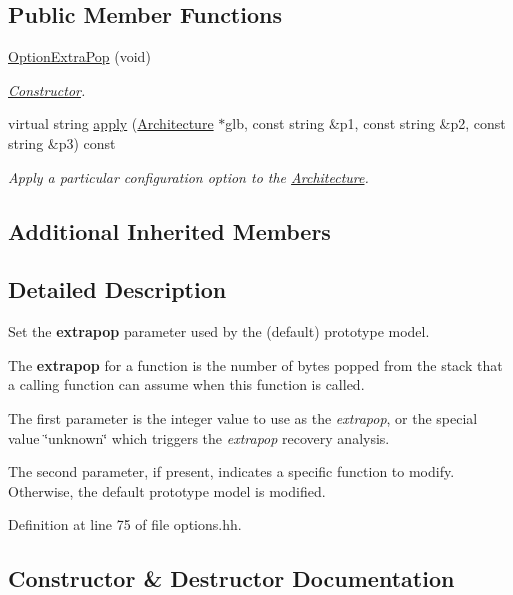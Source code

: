\subsection*{Public Member Functions}
\begin{DoxyCompactItemize}
\item 
\mbox{\hyperlink{class_option_extra_pop_a6dcc3975f9cdfa288283fe8f86ac2b09}{Option\+Extra\+Pop}} (void)
\begin{DoxyCompactList}\small\item\em \mbox{\hyperlink{class_constructor}{Constructor}}. \end{DoxyCompactList}\item 
virtual string \mbox{\hyperlink{class_option_extra_pop_a19de8bfd77683f807a1a20ba4d9103dc}{apply}} (\mbox{\hyperlink{class_architecture}{Architecture}} $\ast$glb, const string \&p1, const string \&p2, const string \&p3) const
\begin{DoxyCompactList}\small\item\em Apply a particular configuration option to the \mbox{\hyperlink{class_architecture}{Architecture}}. \end{DoxyCompactList}\end{DoxyCompactItemize}
\subsection*{Additional Inherited Members}


\subsection{Detailed Description}
Set the {\bfseries{extrapop}} parameter used by the (default) prototype model. 

The {\bfseries{extrapop}} for a function is the number of bytes popped from the stack that a calling function can assume when this function is called.

The first parameter is the integer value to use as the {\itshape extrapop}, or the special value \char`\"{}unknown\char`\"{} which triggers the {\itshape extrapop} recovery analysis.

The second parameter, if present, indicates a specific function to modify. Otherwise, the default prototype model is modified. 

Definition at line 75 of file options.\+hh.



\subsection{Constructor \& Destructor Documentation}
\mbox{\label{class_option_extra_pop_a6dcc3975f9cdfa288283fe8f86ac2b09}} 
